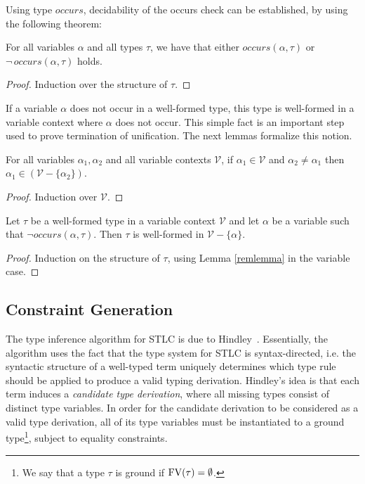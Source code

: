 Using type $occurs$, decidability of the occurs check can be
established, by using the following theorem:

\begin{Lemma}
   For all variables $\alpha$ and all types $\tau$, we have that
   either $occurs(\alpha,\tau)$ or $\neg\,occurs(\alpha,\tau)$ holds.
\end{Lemma}
\begin{proof}
    Induction over the structure of $\tau$.
\end{proof}

If a variable $\alpha$ does not occur in a well-formed type, this type
is well-formed in a variable context where $\alpha$ does not occur.
This simple fact is an important step used to prove termination of
unification. The next lemmas formalize this notion.

\begin{Lemma}\label{remlemma}
For all variables $\alpha_1,\alpha_2$ and all variable contexts $\mathcal{V}$,
if $\alpha_1\in\mathcal{V}$ and $\alpha_2 \neq \alpha_1$ then
$\alpha_1 \in (\mathcal{V} - \{\alpha_2\})$.
\end{Lemma}
\begin{proof}
Induction over $\mathcal{V}$.
\end{proof}

\begin{Lemma}
Let $\tau$ be a well-formed type in a variable context $\mathcal{V}$
and let $\alpha$ be a variable such that $\neg
occurs(\alpha,\tau)$. Then $\tau$ is well-formed in $\mathcal{V}-\{\alpha\}$.
\end{Lemma}
\begin{proof}
    Induction on the structure of $\tau$, using Lemma \ref{remlemma}
    in the variable case.
\end{proof}

\subsection{Constraint Generation}\label{constr-gen}

The type inference algorithm for STLC is due to
Hindley~\cite{Hindley08}.  Essentially, the algorithm uses the fact
that the type system for STLC is syntax-directed, i.e. the syntactic
structure of a well-typed term uniquely determines which type rule
should be applied to produce a valid typing derivation.  Hindley's
idea is that each term induces a \emph{candidate type derivation},
where all missing types consist of distinct type variables.  In order
for the candidate derivation to be considered as a valid type
derivation, all of its type variables must be instantiated to a ground
type\footnote{We say that a type $\tau$ is ground if $\text{FV}(\tau) =
  \emptyset$.}, subject to equality constraints.

